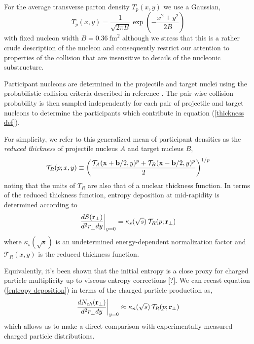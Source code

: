 \documentclass[aps,prl,reprint,amsmath,nofootinbib]{revtex4-1}
\begin{document}
For the average transverse parton density $T_p(x,y)$ we use a Gaussian,
\begin{equation}
  T_p(x,y) = \frac{1}{\sqrt{2 \pi B}} \exp\left(-\frac{x^2+y^2}{2 B}\right)
\end{equation}
with fixed nucleon width $B=0.36 ~\mathrm{fm}^2$ although we stress that this is a rather crude description of
the nucleon and consequently restrict our attention to properties of the collision that are insensitive to
details of the nucleonic substructure.

Participant nucleons are determined in the projectile and target nuclei using the probabilistic collision
criteria described in reference \cite{proton-proton}.  The pair-wise collision probability is then sampled
independently for each pair of projectile and target nucleons to determine the participants which contribute
in equation (\ref{thickness def}).

For simplicity, we refer to this generalized mean of participant densities as the \emph{reduced thickness} of
projectile nucleus $A$ and target nucleus $B$,
\begin{equation}
  \label{reduced}
  \mathcal{T}_R(p;x,y) \equiv
  \left( \frac{\mathcal{T}_A({\bf x}+{\bf b}/2,y)^p + \mathcal{T}_B({\bf x}-{\bf b}/2,y)^p}{2} \right)^{1/p}
\end{equation}
noting that the units of $T_R$ are also that of a nuclear thickness function. In terms of the reduced
thickness function, entropy deposition at mid-rapidity is determined according to
\begin{equation}
  \label{entropy deposition}
  \frac{dS({\bf r}_\perp)}{d^2r_\perp dy} \biggr \rvert_{y=0} = \kappa_s(\sqrt{s})\, \mathcal{T}_R(p;{\bf r}_\perp)
\end{equation}
where $\kappa_s(\sqrt{s})$ is an undetermined energy-dependent normalization factor and $\mathcal{T}_R(x,y)$
is the reduced thickness function.

Equivalently, it's been shown that the initial entropy is a close proxy for charged particle multiplicity up
to viscous entropy corrections [?]. We can recast equation (\ref{entropy deposition}) in terms of the charged
particle production as,
\begin{equation}
  \label{particle production}
  \frac{dN_{ch}({\bf r}_\perp)}{d^2r_\perp dy} \biggr \rvert_{y=0} \approx
  \kappa_n(\sqrt{s})\, \mathcal{T}_R(p;{\bf r}_\perp)
\end{equation}
which allows us to make a direct comparison with experimentally measured charged particle distributions.
\end{document}
